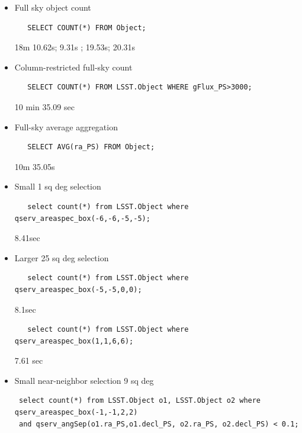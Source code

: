 \documentclass[DM,toc]{lsstdoc}
\begin{document}
\begin{itemize}
\item
  Full sky object count

\begin{verbatim}
   SELECT COUNT(*) FROM Object;
\end{verbatim}

18m 10.62s; 9.31s ; 19.53s; 20.31s

\item
  Column-restricted full-sky count

\begin{verbatim}
   SELECT COUNT(*) FROM LSST.Object WHERE gFlux_PS>3000;
\end{verbatim}

10 min 35.09 sec

\item
  Full-sky average aggregation

\begin{verbatim}
   SELECT AVG(ra_PS) FROM Object;
\end{verbatim}

10m 35.05s

\item
  Small 1 sq deg selection

\begin{verbatim}
   select count(*) from LSST.Object where qserv_areaspec_box(-6,-6,-5,-5);
\end{verbatim}

8.41sec

\item
  Larger 25 sq deg selection

\begin{verbatim}
   select count(*) from LSST.Object where qserv_areaspec_box(-5,-5,0,0);
\end{verbatim}

8.1sec

\begin{verbatim}
   select count(*) from LSST.Object where qserv_areaspec_box(1,1,6,6);
\end{verbatim}

7.61 sec

\item
  Small near-neighbor selection 9 sq deg

\begin{verbatim}
 select count(*) from LSST.Object o1, LSST.Object o2 where qserv_areaspec_box(-1,-1,2,2)
 and qserv_angSep(o1.ra_PS,o1.decl_PS, o2.ra_PS, o2.decl_PS) < 0.1;
\end{verbatim}


\end{itemize}
\end{document}
